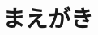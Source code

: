 \documentclass[paper]{ieicej}
\begin{document}
\begin{abstract}

\end{abstract}
\begin{keyword}
\end{keyword}
\begin{eabstract}
\end{eabstract}
\begin{ekeyword}
\end{ekeyword}
\maketitle

\section{まえがき}

\ack %

%
%
\begin{thebibliography}{99}%
\bibitem{}
\end{thebibliography}

\appendix
\section{}

\begin{biography}
\profile{}{}{}
\end{biography}
\end{document}
